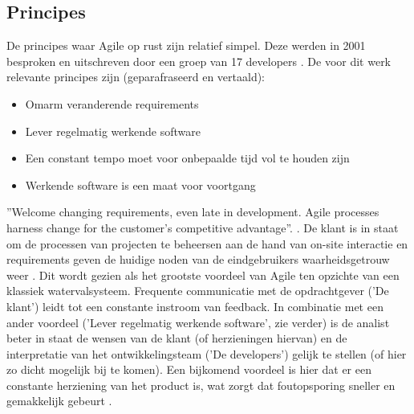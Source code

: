 %
%
%

\subsection{Principes}
De principes waar Agile op rust zijn relatief simpel. Deze werden in 2001 besproken en uitschreven door een groep van 17 developers \autocite{Beck2001}. De voor dit werk relevante principes zijn (geparafraseerd en vertaald):
\begin{itemize}
  \item Omarm veranderende requirements
  \item Lever regelmatig werkende software
  \item Een constant tempo moet voor onbepaalde tijd vol te houden zijn
  \item Werkende software is een maat voor voortgang
\end{itemize}

''Welcome changing requirements, even late in
development. Agile processes harness change for
the customer's competitive advantage''. \autocite{Beck2001}. De klant is in staat om de processen van projecten te beheersen  aan de hand van on-site interactie en requirements geven de huidige noden van de eindgebruikers waarheidsgetrouw weer \autocite{Kumar2012}. Dit wordt gezien als het grootste voordeel van Agile ten opzichte van een klassiek watervalsysteem. Frequente communicatie met de opdrachtgever ('De klant') leidt tot een constante instroom van feedback. In combinatie met een ander voordeel ('Lever regelmatig werkende software', zie verder) is de analist beter in staat de wensen van de klant (of herzieningen hiervan) en de interpretatie van het ontwikkelingsteam ('De developers') gelijk te stellen (of hier zo dicht mogelijk bij te komen). Een bijkomend voordeel is hier dat er een constante herziening van het product is, wat zorgt dat foutopsporing sneller en gemakkelijk gebeurt \autocite{Imreh2011}.

